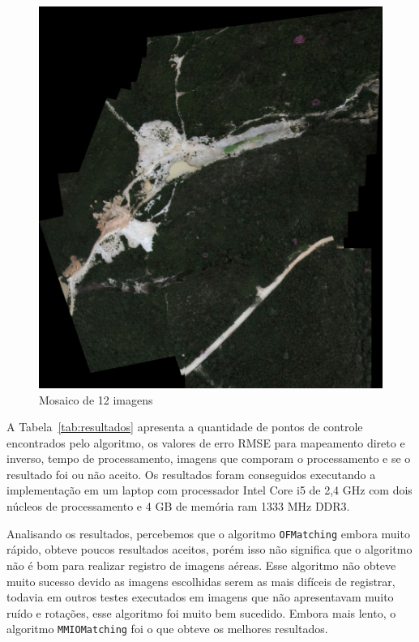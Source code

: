 \documentclass[9pt, a4paper, nofonttune, journal]{IEEEtran}
\begin{document}
\begin{figure}[!b]
\begin{center}
\includegraphics[scale=0.30]{figuras/mosaico}
\caption{Mosaico de 12 imagens}
\label{fig:mosaico}
\end{center}
\end{figure}

A Tabela~\ref{tab:resultados} apresenta a quantidade de pontos de controle encontrados pelo algoritmo, os valores de erro RMSE para mapeamento direto e inverso, tempo de processamento, imagens que comporam o processamento e se o resultado foi ou não aceito. Os resultados foram conseguidos executando a implementação em um laptop com processador Intel Core i5 de 2,4 GHz com dois núcleos de processamento e 4 GB de memória ram 1333 MHz DDR3.

Analisando os resultados, percebemos que o algoritmo \texttt{OFMatching} embora muito rápido, obteve poucos resultados aceitos, porém isso não significa que o algoritmo não é bom para realizar registro de imagens aéreas. Esse algoritmo não obteve muito sucesso devido as imagens escolhidas serem as mais difíceis de registrar, todavia em outros testes executados em imagens que não apresentavam muito ruído e rotações, esse algoritmo foi muito bem sucedido. Embora mais lento, o algoritmo \texttt{MMIOMatching} foi o que obteve os melhores resultados.
\end{document}
